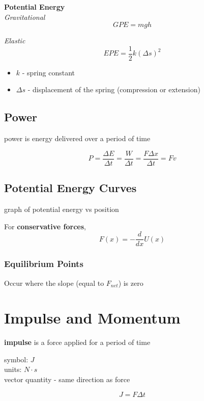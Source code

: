 \documentclass[titlepage]{article}
\begin{document}
\textbf{Potential Energy} \\
\emph{Gravitational}
\begin{equation*}
    GPE = mgh
\end{equation*}

\emph{Elastic}
\begin{equation*}
    EPE = \frac{1}{2}k (\Delta s)^2
\end{equation*}
\begin{itemize}
    \item $k$ - spring constant 
    \item $\Delta s$ - displacement of the spring (compression or extension)
\end{itemize}

\subsection{Power}
power is energy delivered over a period of time

\begin{equation*}
    P = \frac{\Delta E}{\Delta t} = \frac{W}{\Delta t} = \frac{F \Delta x}{\Delta t} = Fv
\end{equation*}

\subsection{Potential Energy Curves}
graph of potential energy vs position

For \textbf{conservative forces},
\begin{equation*}
    F(x) = -\frac{d}{dx} U(x)
\end{equation*}

\subsubsection{Equilibrium Points}
Occur where the slope (equal to $F_{net}$) is zero


\section{Impulse and Momentum}
\textbf{impulse} is a force applied for a period of time

symbol: $J$ \\
units: $N \cdot s$\\
vector quantity - same direction as force

\begin{equation*}
    J = F \Delta t
\end{equation*}
\end{document}
